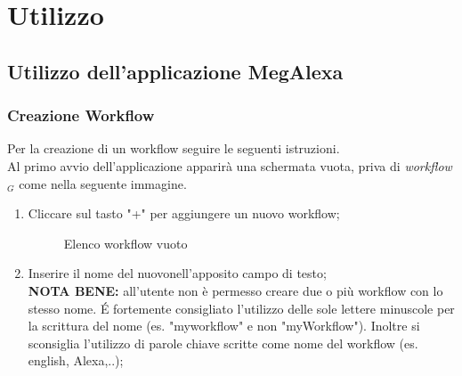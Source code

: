 \chapter{Utilizzo}
\label{Utilizzo}
\section{Utilizzo dell'applicazione MegAlexa} \label{UtilizzoApp}
\subsection{Creazione Workflow}
Per la creazione di un workflow seguire le seguenti istruzioni.\\
Al primo avvio dell'applicazione apparirà una schermata vuota, priva di \textit{workflow$_{G}$} come nella seguente immagine.
\begin{enumerate}
\item Cliccare sul tasto "+" per aggiungere un nuovo workflow;

	\begin{figure}[H]
		\centering
		\caption{Elenco workflow vuoto}
	\end{figure}

\item Inserire il nome del nuovonell'apposito campo di testo;\\
\textbf{NOTA BENE:} all'utente non è permesso creare due o più workflow con lo stesso nome. É fortemente consigliato l'utilizzo delle sole lettere minuscole per la scrittura del nome (es. "myworkflow" e non "myWorkflow"). Inoltre si sconsiglia l'utilizzo di parole chiave scritte come nome del workflow (es. english, Alexa,..);


\end{enumerate}
